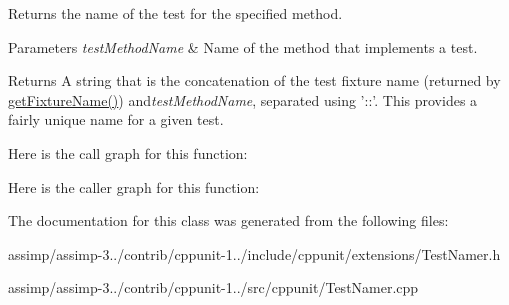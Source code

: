 Returns the name of the test for the specified method. 


\begin{DoxyParams}{Parameters}
{\em test\+Method\+Name} & Name of the method that implements a test. \\
\hline
\end{DoxyParams}
\begin{DoxyReturn}{Returns}
A string that is the concatenation of the test fixture name (returned by \hyperlink{class_test_namer_a19ff7fb473c7e238711996dcd3b733c4}{get\+Fixture\+Name()}) and{\itshape test\+Method\+Name}, separated using '\+:\+:'. This provides a fairly unique name for a given test. 
\end{DoxyReturn}


Here is the call graph for this function\+:




Here is the caller graph for this function\+:




The documentation for this class was generated from the following files\+:\begin{DoxyCompactItemize}
\item 
assimp/assimp-\/3../contrib/cppunit-\/1../include/cppunit/extensions/Test\+Namer.\+h\item 
assimp/assimp-\/3../contrib/cppunit-\/1../src/cppunit/Test\+Namer.\+cpp\end{DoxyCompactItemize}
